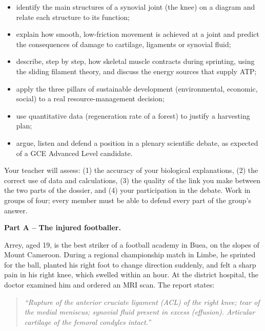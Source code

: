\documentclass[11pt]{article}
\newcounter{popsec}
\newcounter{popsub}
\newcommand{\courssub}[1]{%
  \stepcounter{popsub}%
  \par\vspace{9pt}\noindent{\popxbold\fontsize{11.5}{13}\selectfont\color{popink}{\color{poporange}\thepopsec.\thepopsub}\hspace{6pt}#1}\par\nopagebreak\vspace{4pt}
}
\begin{document}
\begin{itemize}
\item identify the main structures of a synovial joint (the knee) on a diagram and relate each structure to its function;
\item explain how smooth, low-friction movement is achieved at a joint and predict the consequences of damage to cartilage, ligaments or synovial fluid;
\item describe, step by step, how skeletal muscle contracts during sprinting, using the sliding filament theory, and discuss the energy sources that supply ATP;
\item apply the three pillars of sustainable development (environmental, economic, social) to a real resource-management decision;
\item use quantitative data (regeneration rate of a forest) to justify a harvesting plan;
\item argue, listen and defend a position in a plenary scientific debate, as expected of a GCE Advanced Level candidate.
\end{itemize}

\begin{attention}
Your teacher will assess: (1) the accuracy of your biological explanations, (2) the correct use of data and calculations, (3) the quality of the link you make between the two parts of the dossier, and (4) your participation in the debate. Work in groups of four; every member must be able to defend every part of the group's answer.
\end{attention}

\courssub{Situation}

\textbf{Part A -- The injured footballer.}

Arrey, aged 19, is the best striker of a football academy in Buea, on the slopes of Mount Cameroon. During a regional championship match in Limbe, he sprinted for the ball, planted his right foot to change direction suddenly, and felt a sharp pain in his right knee, which swelled within an hour. At the district hospital, the doctor examined him and ordered an MRI scan. The report states:

\begin{quote}
\emph{``Rupture of the anterior cruciate ligament (ACL) of the right knee; tear of the medial meniscus; synovial fluid present in excess (effusion). Articular cartilage of the femoral condyles intact.''}
\end{quote}
\end{document}
